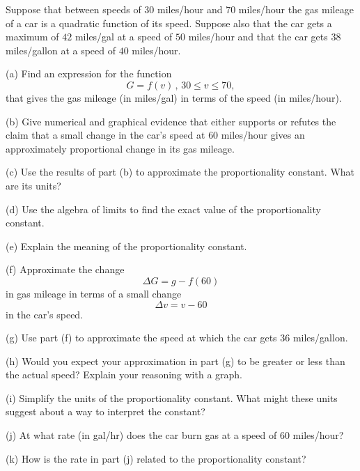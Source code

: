 \documentclass{ximera}
\begin{document}
\begin{example}  \label{Ex:34t45rtg}
Suppose that between speeds of $30$ miles/hour and $70$ miles/hour the gas mileage of a car is a quadratic function of its speed. 
Suppose also that the car gets a maximum of $42$ miles/gal at a speed of $50$ miles/hour and that the car gets $38$ miles/gallon at a speed of $40$ miles/hour.

(a) Find an expression for the function
\[
    G = f(v) \, , \, 30\leq v \leq 70 ,
\]
that gives the gas mileage (in miles/gal) in terms of the speed (in miles/hour).

(b) Give numerical  and graphical evidence that either supports or refutes the claim that a small change in the car's speed at $60$ miles/hour gives an approximately proportional change in its gas mileage.

(c) Use the results of part (b) to approximate the proportionality constant. What are its units?

(d) Use the algebra of limits to find the exact value of the proportionality constant.

(e) Explain the meaning of the proportionality constant.

(f) Approximate the change
\[
    \Delta G = g - f(60)
\]
in gas mileage in terms of a small change
\[
  \Delta v = v - 60
\]
in the car's speed.

(g) Use part (f) to approximate the speed at which the car gets $36$ miles/gallon. 

(h) Would you expect your approximation in part (g) to be greater or less than the actual speed? Explain your reasoning with a graph.

(i) Simplify the units of the proportionality constant. What might these units suggest about a way to interpret the constant?

(j) At what rate (in gal/hr) does the car burn gas at a speed of $60$ miles/hour? 

(k) How is the rate in part (j) related to the proportionality constant?

\end{example}
\end{document}
